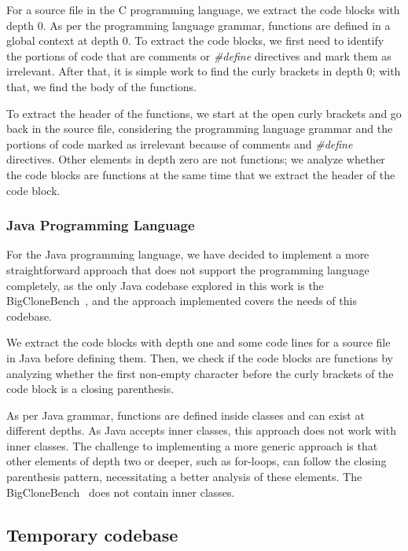 For a source file in the C programming language, we extract the code blocks with depth 0. 
As per the programming language grammar, functions are defined in a global context at depth 0. 
To extract the code blocks, we first need to identify the portions of code that are comments or 
\textit{\#define} directives and mark them as irrelevant. After that, it is simple work to find 
the curly brackets in depth 0; with that, we find the body of the functions.

To extract the header of the functions, we start at the open curly brackets and go back in the 
source file, considering the programming language grammar and the portions of code 
marked as irrelevant because of comments and \textit{\#define} directives.
Other elements in depth zero are not functions; we analyze whether the code blocks 
are functions at the same time that we extract the header of the code block.

\subsubsection{Java Programming Language}

For the Java programming language, we have decided to implement a more straightforward approach 
that does not support the programming language completely, as the only Java codebase explored in 
this work is the BigCloneBench~\citep{bigclonebench}, and the approach implemented covers the 
needs of this codebase.

We extract the code blocks with depth one and some code lines for a source file in Java before 
defining them. Then, we check if the code blocks are functions by analyzing whether the first 
non-empty character before the curly brackets of the code block is a closing parenthesis.

As per Java grammar, functions are defined inside classes and can exist at different depths. 
As Java accepts inner classes, this approach does not work with inner classes. The challenge 
to implementing a more generic approach is that other elements of depth two or deeper, such 
as for-loops, can follow the closing parenthesis pattern, necessitating a better analysis of 
these elements. The BigCloneBench~\citep{bigclonebench} does not contain inner classes.

\subsection{Temporary codebase}

